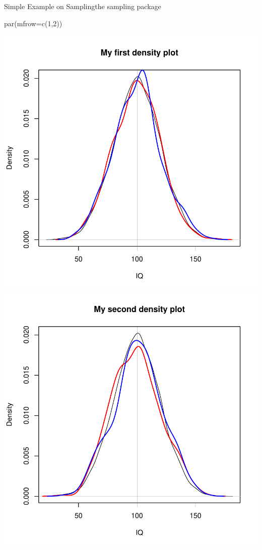 \documentclass[11pt,german,hideothersubsections]{beamer}
\begin{document}
\begin{frame}[fragile]{Simple Example on Sampling}{the sampling package}
\begin{Schunk}
\begin{Sinput}
 par(mfrow=c(1,2))
\end{Sinput}
\end{Schunk}
\begin{minipage}{5.5cm}
\includegraphics{Day1-018}
\includegraphics{Day1-019}

\end{minipage}
\end{frame}
\end{document}
